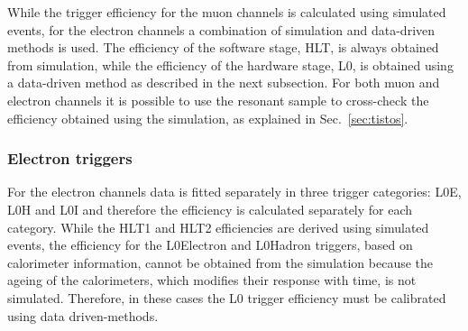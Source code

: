 While the trigger efficiency for the muon channels is calculated using simulated events,
for the electron channels a combination of simulation and data-driven methods is used.
The efficiency of the software stage, HLT, is always obtained from simulation,
while the efficiency of the hardware stage, L0, is obtained using a data-driven method
as described in the next subsection.
For both muon and electron channels it is possible to use the resonant sample to cross-check
the efficiency obtained using the simulation, as explained in Sec.~\ref{sec:tistos}.

\subsubsection{Electron triggers}
\label{sec:RKst_trigee}

For the electron channels data is fitted separately in three trigger categories: L0E, L0H and L0I
and therefore the efficiency is calculated separately for each category.
While the HLT1 and HLT2 efficiencies are derived using simulated events,
the efficiency for the L0Electron and L0Hadron triggers, based on calorimeter information,
 cannot be obtained from the simulation because the ageing of the calorimeters, which 
 modifies their response with time, is not simulated.
Therefore, in these cases the L0 trigger efficiency must be calibrated using data driven-methods.

